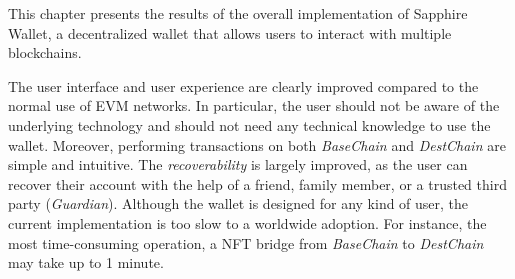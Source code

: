 This chapter presents the results of the overall implementation of Sapphire Wallet, a decentralized wallet that allows users to interact with multiple blockchains. 

The user interface and user experience are clearly improved compared to the normal use of EVM networks. In particular, the user should not be aware of the underlying technology and should not need any technical knowledge to use the wallet. Moreover, performing transactions on both \textit{BaseChain} and \textit{DestChain} are simple and intuitive. The \textit{recoverability} is largely improved, as the user can recover their account with the help of a friend, family member, or a trusted third party (\textit{Guardian}). Although the wallet is designed for any kind of user, the current implementation is too slow to a worldwide adoption. For instance, the most time-consuming operation, a NFT bridge from \textit{BaseChain} to \textit{DestChain} may take up to 1 minute.

